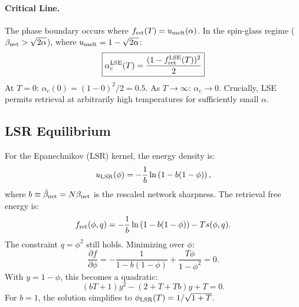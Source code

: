 \documentclass{article}
\theoremstyle{plain}
\theoremstyle{definition}
\theoremstyle{remark}
\begin{document}
\paragraph{Critical Line.} The phase boundary occurs where $f_{\rm ret}(T) = u_{\rm melt}(\alpha)$. In the spin-glass regime ($\beta_{\rm net} > \sqrt{2\alpha}$), where $u_{\rm melt} = 1 - \sqrt{2\alpha}$:
\begin{equation}
    \boxed{\alpha_c^{\rm LSE}(T) = \frac{(1 - f_{\rm ret}^{\rm LSE}(T))^2}{2}}
    \label{eq:alpha_lse}
\end{equation}
At $T = 0$: $\alpha_c(0) = (1-0)^2/2 = 0.5$. As $T \to \infty$: $\alpha_c \to 0$. Crucially, LSE permits retrieval at arbitrarily high temperatures for sufficiently small $\alpha$.

\subsection{LSR Equilibrium}

For the Epanechnikov (LSR) kernel, the energy density is:
\begin{equation}
    u_{\rm LSR}(\phi) = -\frac{1}{b} \ln\left(1 - b(1-\phi)\right),
\end{equation}
where $b \equiv \hat{\beta}_{\rm net} = N\beta_{\rm net}$ is the rescaled network sharpness. The retrieval free energy is:
\begin{equation}
    f_{\rm ret}(\phi, q) = -\frac{1}{b} \ln\left(1 - b(1-\phi)\right) - T s(\phi, q).
\end{equation}
The constraint $q = \phi^2$ still holds. Minimizing over $\phi$:
\begin{equation}
    \frac{\partial f}{\partial \phi} = -\frac{1}{1 - b(1-\phi)} + \frac{T\phi}{1-\phi^2} = 0.
\end{equation}
With $y = 1 - \phi$, this becomes a quadratic:
\begin{equation}
    (bT + 1)y^2 - (2 + T + Tb)y + T = 0.
    \label{eq:lsr_quadratic}
\end{equation}
For $b = 1$, the solution simplifies to $\phi_{\rm LSR}(T) = 1/\sqrt{1+T}$.
\end{document}
